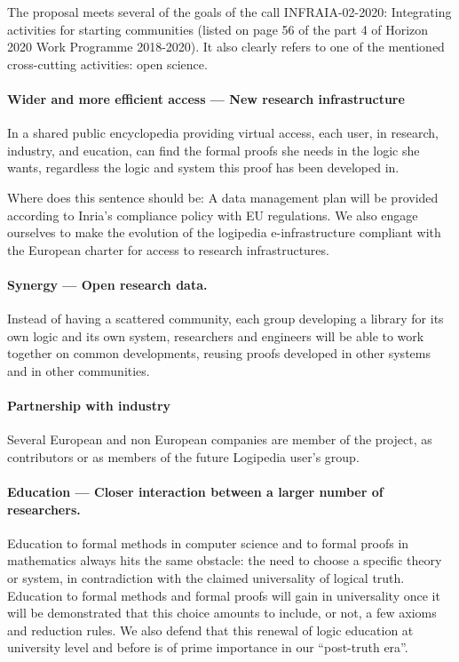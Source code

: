 The proposal meets several of the goals of the call INFRAIA-02-2020:
Integrating activities for starting communities (listed on page 56 of
the part 4 of Horizon 2020 Work Programme 2018-2020). It also clearly
refers to one of the mentioned cross-cutting activities: open science.

\paragraph{Wider and more efficient access --- New research infrastructure}
In a shared public encyclopedia providing virtual access, each user,
in research, industry, and eucation, can find the formal proofs she
needs in the logic she wants, regardless the logic and system this
proof has been developed in.

{\color{red} Where does this sentence should be: 
A data management plan will be provided according to Inria's
compliance policy with EU regulations. We also engage ourselves to
make the evolution of the logipedia e-infrastructure compliant with
the European charter for access to research infrastructures.}

\paragraph{Synergy --- Open research data.}
Instead of having a scattered community, each group developing a
library for its own logic and its own system, researchers and
engineers will be able to work together on common developments,
reusing proofs developed in other systems and in other communities.


\paragraph{Partnership with industry}

Several European and non European companies are member of the project,
as contributors or as members of the future {\sc Logipedia} user's group.

\paragraph{Education --- Closer interaction between a larger number of
researchers.}
Education to formal methods in computer science and to formal proofs
in mathematics always hits the same obstacle: the need to choose a
specific theory or system, in contradiction with the claimed
universality of logical truth. Education to formal methods and formal
proofs will gain in universality once it will be demonstrated that
this choice amounts to include, or not, a few axioms and reduction
rules. We also defend that this renewal of logic education at
university level and before is of prime importance in our ``post-truth
era''.

